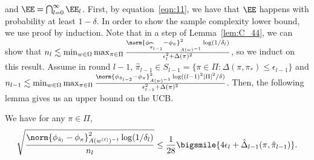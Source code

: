 \documentclass{article}
\newcommand{\pill}{\widehat{\pi}_{l-1}}
\newcommand{\1}{\mathbf{1}}
\begin{document}
and $\EE=\bigcap_{l=0}^\infty\EE_l$. First, by equation~\ref{eqn:11}, we have that $\EE$ happens with probability at least $1-\delta$. 
In order to show the sample complexity lower bound, we use proof by induction. Note that in a step of Lemma~\ref{lem:C_44}, we can show that $n_l\lesssim \min_{w\in\Omega}\max_{\pi\in\Pi}\frac{\norm{\phi_{\pill}-\phi_{\pi}}_{A(w)^{-1}}^2\log(1/\delta_l)}{\epsilon_l^2+\Delta(\pi)^2}$, so we induct on this result. Assume in round $l-1$, $\pill\in S_{l-1}=\{\pi\in\Pi:\Delta(\pi,\pi_*)\leq \epsilon_{l-1}\}$ and $n_{l-1}\lesssim \min_{w\in\Omega}\max_{\pi\in\Pi}\frac{\norm{\phi_{\hat{\pi}_{l-2}}-\phi_\pi}_{A(w)^{-1}}^2\log((l-1)^2|\Pi|^2/\delta)}{\epsilon_{l-1}^2+\Delta(\pi)^2}$. Then, the following lemma gives us an upper bound on the UCB. 
\begin{lemma}\label{lem:1.8}
We have for any $\pi\in\Pi$,
\[\sqrt{\frac{\norm{\phi_{\hat{\pi}_l}-\phi_\pi}_{A(w^{(\ell)})^{-1}}^2\log(1/\delta_l)}{n_{l}}}\leq \frac{1}{28}\bigsmile{4\epsilon_{l}+\hat{\Delta}_{l-1}(\pi,\hat{\pi}_{l-1})}.\]
\end{lemma}
\end{document}
